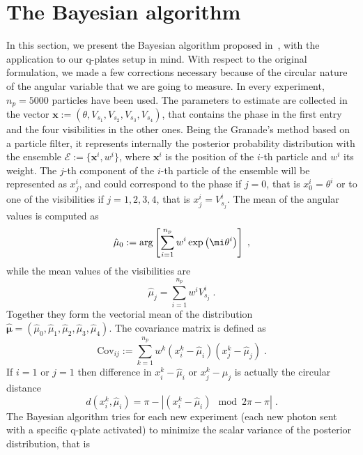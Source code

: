 \documentclass[superscriptaddress,notitlepage,pra]{revtex4-1}
\begin{document}
\section{The Bayesian algorithm}
%
In this section, we present the Bayesian algorithm proposed in~\cite{granade2012robust}, with the application to our q-plates setup in mind. With respect to the original formulation, we made a few corrections necessary because of the circular nature of the angular variable that we are going to measure. In every experiment, $n_p = 5000$ particles have been used. The parameters to estimate are collected in the vector $\boldsymbol{x} := \left( \theta, V_{s_1}, V_{s_2}, V_{s_3}, V_{s_4} \right)$, that contains the phase in the first entry and the four visibilities in the other ones. Being the Granade's method based on a particle filter, it represents internally the posterior probability distribution with the ensemble $\mathcal{E} := \lbrace \boldsymbol{x}^i, w^i \rbrace$, where $\boldsymbol{x}^i$ is the position of the $i$-th particle and $w^i$ its weight. The $j$-th component of the $i$-th particle of the ensemble will be represented as $x_j^i$, and could correspond to the phase if $j=0$, that is $x^i_0 = \theta^i$ or to one of the visibilities if $j=1, 2, 3, 4$, that is $x^i_j = V^i_{s_j}$. The mean of the angular values is computed as
%
\begin{equation}
	\hat{\mu}_0 := \arg \left[ \sum_{i=1}^{n_{p}} w^i \exp \left( \mi \theta^i \right) \right] \; ,
\end{equation}
%
while the mean values of the visibilities are
%
\begin{equation}
	\hat{\mu}_j = \sum_{i=1}^{n_p} w^i V^i_{s_j} \; .
\end{equation}
%
Together they form the vectorial mean of the distribution $\boldsymbol{\hat{\mu}} = (\hat{\mu}_0, \hat{\mu}_1, \hat{\mu}_2, \hat{\mu}_3, \hat{\mu}_4)$. The covariance matrix is defined as
%
\begin{equation}
	\text{Cov}_{ij} := \sum_{k=1}^{n_{p}} w^k (x^k_i - \hat{\mu}_i)  (x^k_j - \hat{\mu}_j) \; .
\end{equation}
%
If $i=1$ or $j=1$ then difference in $x^k_i - \hat{\mu}_i$ or $x^k_j - \hat{\mu}_j$ is actually the circular distance
%
\begin{equation}
	d(x^k_i, \hat{\mu}_i) = \pi - | (x^k_i - \hat{\mu}_i) \mod 2 \pi - \pi| \; .
\end{equation}
%
The Bayesian algorithm tries for each new experiment (each new photon sent with a specific q-plate activated) to minimize the scalar variance of the posterior distribution, that is
\end{document}
